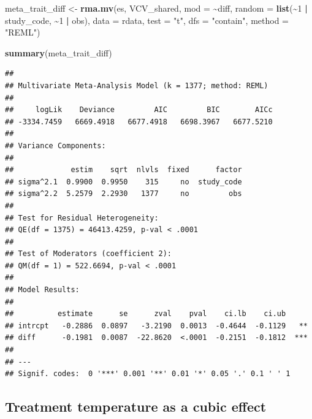 \documentclass[
]{article}
\newenvironment{Shaded}{\begin{snugshade}}{\end{snugshade}}
\newcommand{\AttributeTok}[1]{\textcolor[rgb]{0.13,0.29,0.53}{#1}}
\newcommand{\DecValTok}[1]{\textcolor[rgb]{0.00,0.00,0.81}{#1}}
\newcommand{\FunctionTok}[1]{\textcolor[rgb]{0.13,0.29,0.53}{\textbf{#1}}}
\newcommand{\NormalTok}[1]{#1}
\newcommand{\OtherTok}[1]{\textcolor[rgb]{0.56,0.35,0.01}{#1}}
\newcommand{\SpecialCharTok}[1]{\textcolor[rgb]{0.81,0.36,0.00}{\textbf{#1}}}
\newcommand{\StringTok}[1]{\textcolor[rgb]{0.31,0.60,0.02}{#1}}
\begin{document}
\begin{Shaded}
\begin{Highlighting}[]
\NormalTok{meta\_trait\_diff }\OtherTok{\textless{}{-}} \FunctionTok{rma.mv}\NormalTok{(es, VCV\_shared, }\AttributeTok{mod =} \SpecialCharTok{\textasciitilde{}}\NormalTok{diff, }\AttributeTok{random =} \FunctionTok{list}\NormalTok{(}\SpecialCharTok{\textasciitilde{}}\DecValTok{1} \SpecialCharTok{|}
\NormalTok{    study\_code, }\SpecialCharTok{\textasciitilde{}}\DecValTok{1} \SpecialCharTok{|}\NormalTok{ obs), }\AttributeTok{data =}\NormalTok{ rdata, }\AttributeTok{test =} \StringTok{"t"}\NormalTok{, }\AttributeTok{dfs =} \StringTok{"contain"}\NormalTok{,}
    \AttributeTok{method =} \StringTok{"REML"}\NormalTok{)}
\end{Highlighting}
\end{Shaded}

\begin{Shaded}
\begin{Highlighting}[]
\FunctionTok{summary}\NormalTok{(meta\_trait\_diff)}
\end{Highlighting}
\end{Shaded}

\begin{verbatim}
## 
## Multivariate Meta-Analysis Model (k = 1377; method: REML)
## 
##     logLik    Deviance         AIC         BIC        AICc   
## -3334.7459   6669.4918   6677.4918   6698.3967   6677.5210   
## 
## Variance Components:
## 
##             estim    sqrt  nlvls  fixed      factor 
## sigma^2.1  0.9900  0.9950    315     no  study_code 
## sigma^2.2  5.2579  2.2930   1377     no         obs 
## 
## Test for Residual Heterogeneity:
## QE(df = 1375) = 46413.4259, p-val < .0001
## 
## Test of Moderators (coefficient 2):
## QM(df = 1) = 522.6694, p-val < .0001
## 
## Model Results:
## 
##          estimate      se      zval    pval    ci.lb    ci.ub      
## intrcpt   -0.2886  0.0897   -3.2190  0.0013  -0.4644  -0.1129   ** 
## diff      -0.1981  0.0087  -22.8620  <.0001  -0.2151  -0.1812  *** 
## 
## ---
## Signif. codes:  0 '***' 0.001 '**' 0.01 '*' 0.05 '.' 0.1 ' ' 1
\end{verbatim}

\newpage

\hypertarget{treatment-temperature-as-a-cubic-effect}{%
\subsection{Treatment temperature as a cubic
effect}\label{treatment-temperature-as-a-cubic-effect}}
\end{document}
